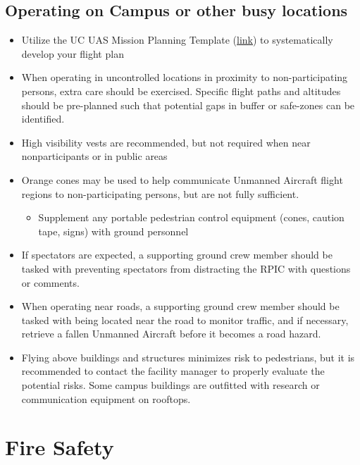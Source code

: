 \documentclass[
]{book}
\providecommand{\tightlist}{%
  \setlength{\itemsep}{0pt}\setlength{\parskip}{0pt}}
\begin{document}
\hypertarget{operating-on-campus-or-other-busy-locations}{%
\section{Operating on Campus or other busy locations}\label{operating-on-campus-or-other-busy-locations}}

\begin{itemize}
\tightlist
\item
  Utilize the UC UAS Mission Planning Template (\href{http://ucdrones.github.io/library/mission_planning_template.docx}{link}) to systematically develop your flight plan
\item
  When operating in uncontrolled locations in proximity to non-participating persons, extra care should be exercised. Specific flight paths and altitudes should be pre-planned such that potential gaps in buffer or safe-zones can be identified.
\item
  High visibility vests are recommended, but not required when near nonparticipants or in public areas
\item
  Orange cones may be used to help communicate Unmanned Aircraft flight regions to non-participating persons, but are not fully sufficient.

  \begin{itemize}
  \tightlist
  \item
    Supplement any portable pedestrian control equipment (cones, caution tape, signs) with ground personnel
  \end{itemize}
\item
  If spectators are expected, a supporting ground crew member should be tasked with preventing spectators from distracting the RPIC with questions or comments.
\item
  When operating near roads, a supporting ground crew member should be tasked with being located near the road to monitor traffic, and if necessary, retrieve a fallen Unmanned Aircraft before it becomes a road hazard.
\item
  Flying above buildings and structures minimizes risk to pedestrians, but it is recommended to contact the facility manager to properly evaluate the potential risks. Some campus buildings are outfitted with research or communication equipment on rooftops.
\end{itemize}

\hypertarget{ch-fire-safety}{%
\chapter{Fire Safety}\label{ch-fire-safety}}
\end{document}
